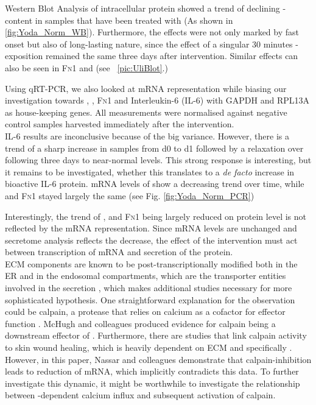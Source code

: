 Western Blot Analysis of intracellular protein showed a trend of declining \colone-content in samples that have been treated with \Yoda{} (As shown in \ref{fig:Yoda_Norm_WB}). Furthermore, the effects were not only marked by fast onset but also of long-lasting nature, since the effect of a singular 30 minutes \Yoda{}-exposition remained the same three days after intervention. Similar effects can also be seen in \textsc{Fn1} and \colthree{} (see ~\vref{pic:UliBlot}.) \par

Using qRT-PCR, we also looked at mRNA representation while biasing our investigation towards \colone{}, \colthree{}, \textsc{Fn}1 and Interleukin-6 (IL-6) with GAPDH and RPL13A as house-keeping genes. All measurements were normalised against negative control samples harvested immediately after the intervention. \\
IL-6 results are inconclusive because of the big variance. However, there is a trend of a sharp increase in \Yoda{} samples from d0 to d1 followed by a relaxation over following three days to near-normal levels. This strong response is interesting, but it remains to be investigated, whether this translates to a \textit{de facto} increase in bioactive IL-6 protein. mRNA levels of \colone{} show a decreasing trend over time, while \colthree and \textsc{Fn}1 stayed largely the same (see Fig. \ref{fig:Yoda_Norm_PCR})\\\par

Interestingly, the trend of \colone{}, \colthree{} and \textsc{Fn1} being largely reduced on protein level is not reflected by the mRNA representation. Since mRNA levels are unchanged and secretome analysis reflects the decrease, the effect of the intervention must act between transcription of mRNA and secretion of the protein. \\
ECM components are known to be post-transcriptionally modified both in the ER and in the endosomal compartments, which are the transporter entities involved in the secretion \cite{Ishida2011, Zeltz2014}, which makes additional studies necessary for more sophisticated hypothesis. One straightforward explanation for the observation could be calpain, a protease that relies on calcium as a cofactor for effector function \cite{Goll2003}. McHugh and colleagues produced evidence for calpain being a downstream effector of \Piezo{} \cite{McHugh2010}. Furthermore, there are studies that link calpain activity to skin wound healing, which is heavily dependent on ECM and specifically \colone{} \cite{Nassar2012}. However, in this paper, Nassar and colleagues demonstrate that calpain-inhibition leads to reduction of \colone{} mRNA, which implicitly contradicts this data. To further investigate this dynamic, it might be worthwhile to investigate the relationship between \Piezo{}-dependent calcium influx and subsequent activation of calpain. \par

